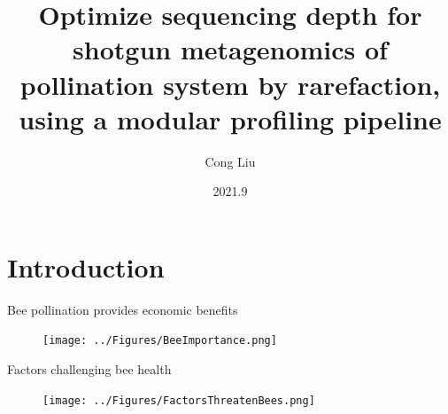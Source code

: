 \documentclass{beamer}
\title{Optimize sequencing depth for shotgun metagenomics of pollination system by rarefaction, using a modular profiling pipeline}
\author{Cong Liu}
\date{2021.9}
\begin{document}
\begin{frame}
    \titlepage    
\end{frame}

\section{Introduction}

\begin{frame}{Bee pollination provides economic benefits}
    \begin{figure}
        \texttt{[image: ../Figures/BeeImportance.png]}
    \end{figure}
    \centering
\end{frame}

\begin{frame}{Factors challenging bee health}
    \begin{figure}
        \texttt{[image: ../Figures/FactorsThreatenBees.png]}
    \end{figure}
\end{frame}
\end{document}
